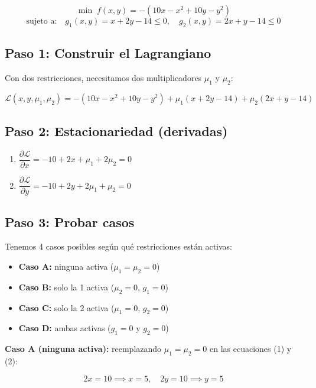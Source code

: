 \documentclass[12pt]{article}
\begin{document}
\[
\min \; f(x, y) = -(10x - x^2 + 10y - y^2)
\]
\[
\text{sujeto a:} \quad g_1(x, y) = x + 2y - 14 \leq 0, \quad g_2(x, y) = 2x + y - 14 \leq 0
\]

\subsection{Paso 1: Construir el Lagrangiano}

Con dos restricciones, necesitamos dos multiplicadores $\mu_1$ y $\mu_2$:

\[
\mathcal{L}(x, y, \mu_1, \mu_2) = -(10x - x^2 + 10y - y^2) + \mu_1(x + 2y - 14) + \mu_2(2x + y - 14)
\]

\subsection{Paso 2: Estacionariedad (derivadas)}

\begin{enumerate}
    \item $\dfrac{\partial \mathcal{L}}{\partial x} = -10 + 2x + \mu_1 + 2\mu_2 = 0$
    \item $\dfrac{\partial \mathcal{L}}{\partial y} = -10 + 2y + 2\mu_1 + \mu_2 = 0$
\end{enumerate}

\subsection{Paso 3: Probar casos}

Tenemos 4 casos posibles según qué restricciones están activas:

\begin{itemize}
    \item \textbf{Caso A:} ninguna activa ($\mu_1 = \mu_2 = 0$)
    \item \textbf{Caso B:} solo la 1 activa ($\mu_2 = 0$, $g_1 = 0$)
    \item \textbf{Caso C:} solo la 2 activa ($\mu_1 = 0$, $g_2 = 0$)
    \item \textbf{Caso D:} ambas activas ($g_1 = 0$ y $g_2 = 0$)
\end{itemize}

\vspace{0.5em}

\textbf{Caso A (ninguna activa):} reemplazando $\mu_1 = \mu_2 = 0$ en las ecuaciones (1) y (2):

\[
2x = 10 \implies x = 5, \quad 2y = 10 \implies y = 5
\]
\end{document}

